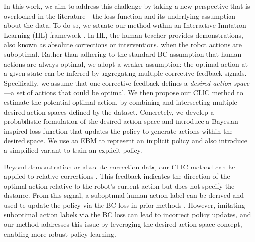 In this work, we aim to address this challenge by taking a new perspective that is overlooked in the literature—the loss function and its underlying assumption about the data. 
To do so, we situate our method within an Interactive Imitation Learning (IIL) framework \cite{2022_IIL_survey}. 
In IIL, the human teacher provides demonstrations, also known as absolute corrections or interventions, when the robot actions are suboptimal. 
Rather than adhering to the standard BC assumption that human actions are always optimal, we adopt a weaker assumption: the optimal action at a given state can be inferred by aggregating multiple corrective feedback signals. 
Specifically, we assume that one corrective feedback defines a \textit{desired action space}—a set of actions that could be optimal.
 We then propose our CLIC method to estimate the potential optimal action, by combining and intersecting multiple desired action spaces defined by the dataset.
 Concretely, we develop a probabilistic formulation of the desired action space and introduce a Bayesian-inspired loss function that updates the policy to generate actions within the desired space.
We use an EBM to represent an implicit policy and also introduce a simplified variant to train an explicit policy.

Beyond demonstration or absolute correction data, our CLIC method can be applied to relative corrections \cite{2022_IIL_survey, 2019_Carlos_IJRR, 2024_IJRR_survery_feedback_types}. This feedback indicates the direction of the optimal action relative to the robot's current action but does not specify the distance.
From this signal, a suboptimal human action label can be derived and used to update the policy via the BC loss in prior methods \cite{2019_Rodrigo_D_COACH, 2019_Carlos_IJRR, 2019_Carlos_COACH}. However, imitating suboptimal action labels via the BC loss can lead to incorrect policy updates, and our method addresses this issue by leveraging the desired action space concept, enabling more robust policy learning.



